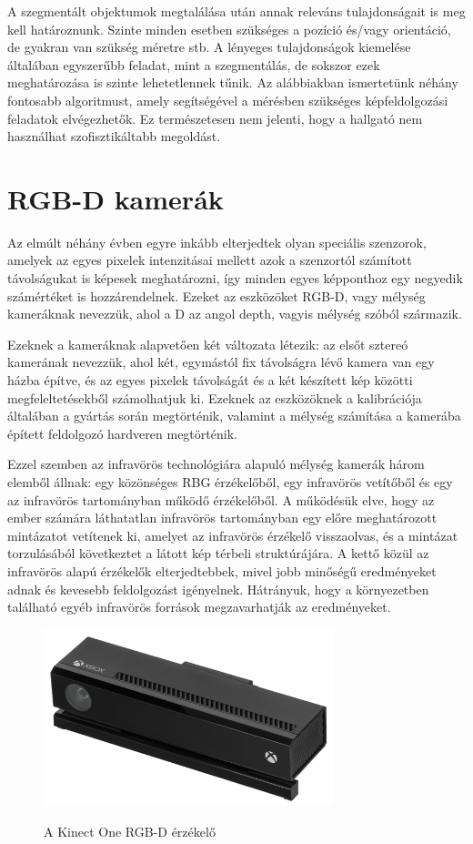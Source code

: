 \documentclass[12pt,a4paper,oneside]{report}             %
\begin{document}
A szegmentált objektumok megtalálása után annak releváns tulajdonságait is meg kell határoznunk. Szinte minden esetben szükséges a pozíció és/vagy orientáció, de gyakran van szükség méretre stb. A lényeges tulajdonságok kiemelése általában egyszerűbb feladat, mint a szegmentálás, de sokszor ezek meghatározása is szinte lehetetlennek tűnik. Az alábbiakban ismertetünk néhány fontosabb algoritmust, amely segítségével a mérésben szükséges képfeldolgozási feladatok elvégezhetők. Ez természetesen nem jelenti, hogy a hallgató nem használhat szofisztikáltabb megoldást.

\section{RGB-D kamerák}

Az elmúlt néhány évben egyre inkább elterjedtek olyan speciális szenzorok, amelyek az egyes pixelek intenzitásai mellett azok a szenzortól számított távolságukat is képesek meghatározni, így minden egyes képponthoz egy negyedik számértéket is hozzárendelnek. Ezeket az eszközöket RGB-D, vagy mélység kameráknak nevezzük, ahol a D az angol depth, vagyis mélység szóból származik.

Ezeknek a kameráknak alapvetően két változata létezik: az elsőt sztereó kamerának nevezzük, ahol két, egymástól fix távolságra lévő kamera van egy házba építve, és az egyes pixelek távolságát és a két készített kép közötti megfeleltetésekből számolhatjuk ki. Ezeknek az eszközöknek a kalibrációja általában a gyártás során megtörténik, valamint a mélység számítása a kamerába épített feldolgozó hardveren megtörténik.

Ezzel szemben az infravörös technológiára alapuló mélység kamerák három elemből állnak: egy közönséges RBG érzékelőből, egy infravörös vetítőből és egy az infravörös tartományban működő érzékelőből. A működésük elve, hogy az ember számára láthatatlan infravörös tartományban egy előre meghatározott mintázatot vetítenek ki, amelyet az infravörös érzékelő visszaolvas, és a mintázat torzulásából következtet a látott kép térbeli struktúrájára. A kettő közül az infravörös alapú érzékelők elterjedtebbek, mivel jobb minőségű eredményeket adnak és kevesebb feldolgozást igényelnek. Hátrányuk, hogy a környezetben található egyéb infravörös források megzavarhatják az eredményeket.

\begin{figure}
	\centering
	\includegraphics[width=0.75\textwidth]{images/Kinect.png}
	\label{fig:1}
	\caption{A Kinect One RGB-D érzékelő}
\end{figure}
\end{document}
